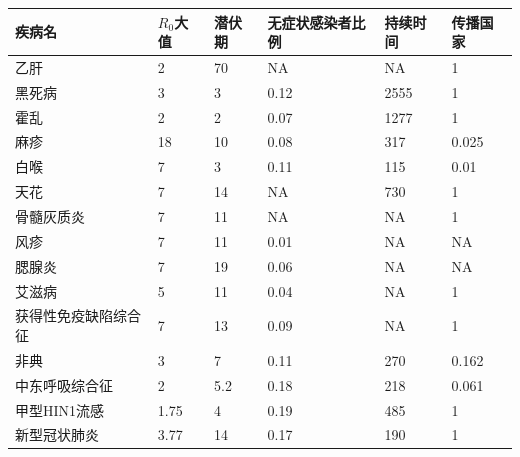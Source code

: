 \documentclass[a4paper, 11pt,twoside=true,UTF8]{scrartcl}
\begin{document}
\begin{table}[H]
	\begin{tabular}{llllll}
		\hline
		\textbf{疾病名} & \textbf{$R_0$大值} & \textbf{潜伏期} & \textbf{无症状感染者比例} & \textbf{持续时间} & \textbf{传播国家} \\ \hline
		乙肝           & 2                & 70           & NA                & NA            & 1               \\
		黑死病          & 3                & 3            & 0.12              & 2555          & 1               \\
		霍乱           & 2                & 2            & 0.07              & 1277          & 1               \\
		麻疹           & 18               & 10           & 0.08              & 317           & 0.025           \\
		白喉           & 7                & 3            & 0.11              & 115           & 0.01            \\
		天花           & 7                & 14           & NA                & 730           & 1               \\
		骨髓灰质炎        & 7                & 11           & NA                & NA            & 1               \\
		风疹           & 7                & 11           & 0.01              & NA            & NA              \\
		腮腺炎          & 7                & 19           & 0.06              & NA            & NA              \\
		艾滋病          & 5                & 11           & 0.04              & NA            & 1               \\
		获得性免疫缺陷综合征   & 7                & 13           & 0.09              & NA            & 1               \\
		非典           & 3                & 7            & 0.11              & 270           & 0.162           \\
		中东呼吸综合征      & 2                & 5.2          & 0.18              & 218           & 0.061           \\
		甲型HIN1流感     & 1.75             & 4            & 0.19              & 485           & 1               \\
		新型冠状肺炎       & 3.77             & 14           & 0.17              & 190           & 1               \\ \hline
	\end{tabular}
\end{table}
\end{document}
